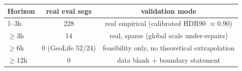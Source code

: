 \begin{tabular}{lcc}
\toprule
Horizon & real eval segs & validation mode \\
\midrule
1--3h & 228 & real empirical (calibrated HDR90 $\approx$0.90) \\
$\ge$3h & 14 & real, sparse (global scale under-repairs) \\
$\ge$6h & 0 (GeoLife 52/24) & feasibility only, no theoretical extrapolation \\
$\ge$12h & 0 & data blank + boundary statement \\
\bottomrule
\end{tabular}